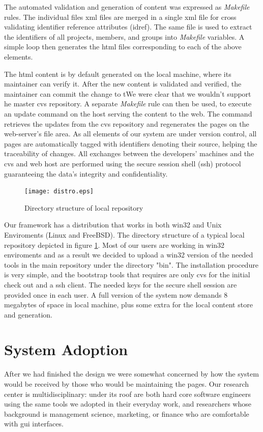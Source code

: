 \documentclass[10pt]{article}
\begin{document}
The automated validation and generation of content was
expressed as {\em Makefile} rules.
The individual files {\sc xml} files are merged in a
single {\sc xml} file for cross validating identifier
reference attributes ({\sc idref}).
The same file is used to extract the identifiers of
all projects, members, and groups into {\em Makefile}
variables.
A simple loop then generates the {\sc html} files
corresponding to each of the above elements.

The {\sc html} content is by default generated on the
local machine, where its maintainer can verify it.
After the new content is validated and verified,
the maintainer can commit the change to tWe were clear 
that we wouldn't support he master {\sc cvs} repository.
A separate {\em Makefile} rule can then be used,
to execute an update command on the
host serving the content to the web.
The command retrieves the updates from the {\sc cvs}
repository and regenerates the pages on the web-server's
file area.
As all elements of our system are under version control,
all pages are automatically tagged with identifiers
denoting their source, helping the traceability of changes.
All exchanges between the developers' machines and the
{\sc cvs} and web host are performed using the secure session
shell ({\sc ssh}) protocol guaranteeing the data's integrity
and confidentiality.

\begin{figure}
\texttt{[image: distro.eps]}
\caption{Directory structure of local repository}
\label{fig:eltrun-web-distro}
\end{figure}

Our framework has a distribution that works in both win32 and 
Unix Enviroments (Linux and FreeBSD). The directory structure of a typical local repository depicted in
figure \ref{fig:eltrun-web-distro}.
Most of our users are working in win32 enviroments and as 
a result we decided to upload a win32 version of the needed tools 
in the main repository under the directory "bin". The installation procedure is very simple,
and the bootstrap tools that requires are only cvs for 
the initial check out and a ssh client. The needed keys 
for the secure shell session are provided once in each user. 
A full version of the system now demands 8 megabytes of space 
in local machine, plus some extra for the local content store and generation.

\section{System Adoption}
\label{sec:adopt}
After we had finished the design we were somewhat concerned
by how the system would be received by those who would be
maintaining the pages.
Our research center is multidisciplinary: under its roof
are both hard core software engineers using the same tools
we adopted in their everyday work, and researchers whose
background is management science, marketing, or finance
who are comfortable with {\sc gui} interfaces.
\end{document}
